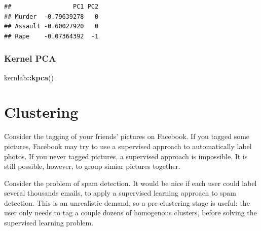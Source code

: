 \documentclass[]{book}
\newenvironment{Shaded}{\begin{snugshade}}{\end{snugshade}}
\newcommand{\KeywordTok}[1]{\textcolor[rgb]{0.13,0.29,0.53}{\textbf{#1}}}
\newcommand{\DataTypeTok}[1]{\textcolor[rgb]{0.13,0.29,0.53}{#1}}
\newcommand{\DecValTok}[1]{\textcolor[rgb]{0.00,0.00,0.81}{#1}}
\newcommand{\FloatTok}[1]{\textcolor[rgb]{0.00,0.00,0.81}{#1}}
\newcommand{\StringTok}[1]{\textcolor[rgb]{0.31,0.60,0.02}{#1}}
\newcommand{\CommentTok}[1]{\textcolor[rgb]{0.56,0.35,0.01}{\textit{#1}}}
\newcommand{\OtherTok}[1]{\textcolor[rgb]{0.56,0.35,0.01}{#1}}
\newcommand{\OperatorTok}[1]{\textcolor[rgb]{0.81,0.36,0.00}{\textbf{#1}}}
\newcommand{\NormalTok}[1]{#1}
\theoremstyle{definition}
\theoremstyle{definition}
\theoremstyle{definition}
\theoremstyle{remark}
\let\BeginKnitrBlock\begin \let\EndKnitrBlock\end
\begin{document}
\begin{Shaded}
\end{Shaded}

\begin{verbatim}
##                 PC1 PC2
## Murder  -0.79639278   0
## Assault -0.60027920   0
## Rape    -0.07364392  -1
\end{verbatim}

\subsubsection{Kernel PCA}\label{kernel-pca-1}

\begin{Shaded}
\begin{Highlighting}[]
\NormalTok{kernlab}\OperatorTok{::}\KeywordTok{kpca}\NormalTok{()}
\end{Highlighting}
\end{Shaded}

\section{Clustering}\label{cluster}

\BeginKnitrBlock{example}
\protect\hypertarget{exm:photos}{}{\label{exm:photos} }Consider the tagging
of your friends' pictures on Facebook. If you tagged some pictures,
Facebook may try to use a supervised approach to automatically label
photos. If you never tagged pictures, a supervised approach is
impossible. It is still possible, however, to group simiar pictures
together.
\EndKnitrBlock{example}

\BeginKnitrBlock{example}
\protect\hypertarget{exm:spam}{}{\label{exm:spam} }Consider the problem of
spam detection. It would be nice if each user could label several
thousands emails, to apply a supervised learning approach to spam
detection. This is an unrealistic demand, so a pre-clustering stage is
useful: the user only needs to tag a couple dozens of homogenous
clusters, before solving the supervised learning problem.
\EndKnitrBlock{example}
\end{document}

